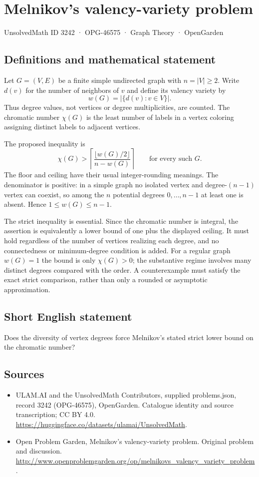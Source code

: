 \documentclass[11pt,a4paper]{article}
\begin{document}
\section*{Melnikov's valency-variety problem}\label{3242}
{\small UnsolvedMath ID 3242 · OPG-46575 · Graph Theory · OpenGarden}
\subsection{Definitions and mathematical statement}
Let $G=(V,E)$ be a finite simple undirected graph with $n=|V|\ge2$. Write $d(v)$ for the number of neighbors of $v$ and define its valency variety by
\[
              w(G)=|\{d(v):v\in V\}|.
\]
Thus degree values, not vertices or degree multiplicities, are counted. The chromatic number $\chi(G)$ is the least number of labels in a vertex coloring assigning distinct labels to adjacent vertices.

The proposed inequality is
\[
 \chi(G)>\left\lceil\frac{\lfloor w(G)/2\rfloor}{n-w(G)}\right\rceil
                \qquad\text{for every such }G.
\]
The floor and ceiling have their usual integer-rounding meanings. The denominator is positive: in a simple graph no isolated vertex and degree-$(n-1)$ vertex can coexist, so among the $n$ potential degrees $0,\ldots,n-1$ at least one is absent. Hence $1\le w(G)\le n-1$.

The strict inequality is essential. Since the chromatic number is integral, the assertion is equivalently a lower bound of one plus the displayed ceiling. It must hold regardless of the number of vertices realizing each degree, and no connectedness or minimum-degree condition is added. For a regular graph $w(G)=1$ the bound is only $\chi(G)>0$; the substantive regime involves many distinct degrees compared with the order. A counterexample must satisfy the exact strict comparison, rather than only a rounded or asymptotic approximation.
\subsection{Short English statement}
Does the diversity of vertex degrees force Melnikov’s stated strict lower bound on the chromatic number?
\subsection{Sources}
\begin{itemize}
\item[S1] ULAM.AI and the UnsolvedMath Contributors, supplied problems.json, record 3242 (OPG-46575), OpenGarden. Catalogue identity and source transcription; CC BY 4.0.
\url{https://huggingface.co/datasets/ulamai/UnsolvedMath}.
\item[S2] Open Problem Garden, Melnikov's valency-variety problem. Original problem and discussion.
\url{http://www.openproblemgarden.org/op/melnikovs_valency_variety_problem}.
\end{itemize}
\end{document}
